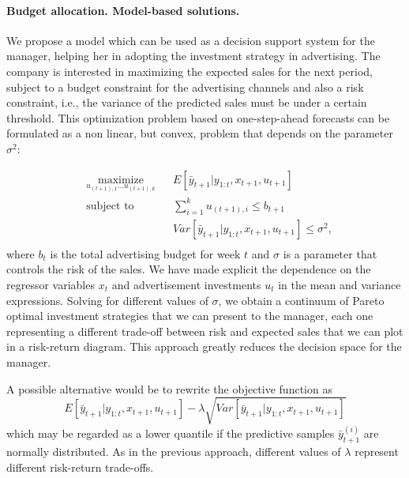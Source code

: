 

\paragraph{Budget allocation. Model-based solutions.}\label{section: budget allocation}

We propose a model which can be used as a decision support system for the manager, helping her in adopting the  investment strategy in advertising. The company is interested in maximizing the expected sales for the next period, subject to a budget constraint for the advertising channels and also a risk constraint, i.e., the variance of the predicted sales must be under a certain threshold.
This optimization problem based on one-step-ahead forecasts can be formulated as a non linear, but convex, problem that depends on the parameter $\sigma^2$:

\begin{equation*}
\begin{aligned}
& \underset{u_{(t+1),1}...u_{(t+1),k}}{\text{maximize}}
& &  E[ \bar{y}_{t+1} | y_{1:t}, x_{t+1}, u_{t+1}] \\
& \text{subject to}
& & \sum_{i=1}^k  u_{(t+1),i} \leq b_{t+1} \\
& & & Var[ \bar{y}_{t+1} | y_{1:t}, x_{t+1}, u_{t+1}] \leq \sigma^2, \\
\end{aligned}
\end{equation*}
where $b_t$ is the total advertising budget for week $t$ and $\sigma$ is a parameter that controls the risk of the sales. We have made explicit the dependence on the regressor variables $x_t$ and advertisement investments $u_t$ in the mean and variance expressions.
Solving for different values of $\sigma$, we obtain a continuum of Pareto optimal investment strategies that we can present to the manager, each one representing a different trade-off between risk and expected sales that we can plot in a risk-return diagram.
This approach greatly reduces the decision space for the manager.

A possible alternative would be to rewrite the objective function as 
$$E[ \bar{y}_{t+1} | y_{1:t}, x_{t+1}, u_{t+1}] - \lambda \sqrt{Var[ \bar{y}_{t+1} | y_{1:t}, x_{t+1}, u_{t+1}]}$$ 
which may be regarded as a lower quantile if the predictive samples $\bar{y}^{(i)}_{t+1}$ are normally distributed.
As in the previous approach, different values of $\lambda$ represent different risk-return trade-offs.

